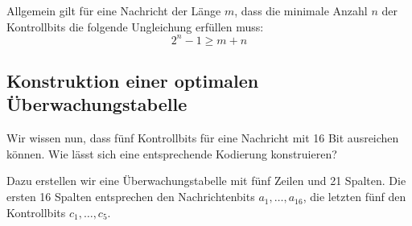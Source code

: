 \begin{myremark}
	Allgemein gilt für eine Nachricht der Länge \(m\), dass die
	minimale Anzahl \(n\) der Kontrollbits die folgende Ungleichung
	erfüllen muss:
	\[
		2^n-1\geq m+n
	\]
\end{myremark}





\subsection*{Konstruktion einer optimalen Überwachungstabelle}

Wir wissen nun, dass fünf Kontrollbits für eine Nachricht
mit 16 Bit ausreichen können. Wie lässt sich eine
entsprechende Kodierung konstruieren?

Dazu erstellen wir eine Überwachungstabelle mit fünf Zeilen
und 21 Spalten. Die ersten 16 Spalten entsprechen den
Nachrichtenbits \(a_1,\ldots,a_{16}\), die letzten fünf den
Kontrollbits \(c_1,\ldots,c_5\).

\begin{center}
\end{center}

